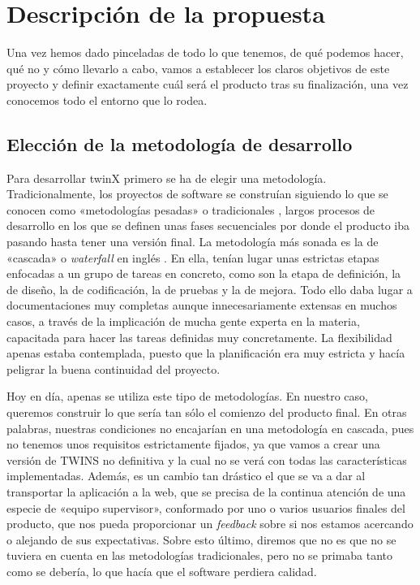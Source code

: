 \section{Descripción de la propuesta}
Una vez hemos dado pinceladas de todo lo que tenemos, de qué podemos hacer, qué no y cómo llevarlo a cabo, vamos a establecer los claros objetivos de este proyecto y definir exactamente cuál será el producto tras su finalización, una vez conocemos todo el entorno que lo rodea. 

\subsection{Elección de la metodología de desarrollo}
Para desarrollar twinX primero se ha de elegir una metodología. Tradicionalmente, los proyectos de software se construían siguiendo lo que se conocen como «metodologías pesadas» o tradicionales \citep{waterfall1}, largos procesos de desarrollo en los que se definen unas fases secuenciales por donde el producto iba pasando hasta tener una versión final. La metodología más sonada es la de «cascada» o \textit{waterfall} en inglés \citep{waterfall2}. En ella, tenían lugar unas estrictas etapas enfocadas a un grupo de tareas en concreto, como son la etapa de definición, la de diseño, la de codificación, la de pruebas y la de mejora. Todo ello daba lugar a documentaciones muy completas aunque innecesariamente extensas en muchos casos, a través de la implicación de mucha gente experta en la materia, capacitada para hacer las tareas definidas muy concretamente. La flexibilidad apenas estaba contemplada, puesto que la planificación era muy estricta y hacía peligrar la buena continuidad del proyecto.

Hoy en día, apenas se utiliza este tipo de metodologías. En nuestro caso, queremos construir lo que sería tan sólo el comienzo del producto final. En otras palabras, nuestras condiciones no encajarían en una metodología en cascada, pues no tenemos unos requisitos estrictamente fijados, ya que vamos a crear una versión de TWINS no definitiva y la cual no se verá con todas las características implementadas. Además, es un cambio tan drástico el que se va a dar al transportar la aplicación a la web, que se precisa de la continua atención de una especie de «equipo supervisor», conformado por uno o varios usuarios finales del producto, que nos pueda proporcionar un \textit{feedback} sobre si nos estamos acercando o alejando de sus expectativas. Sobre esto último, diremos que no es que no se tuviera en cuenta en las metodologías tradicionales, pero no se primaba tanto como se debería, lo que hacía que el software perdiera calidad.

